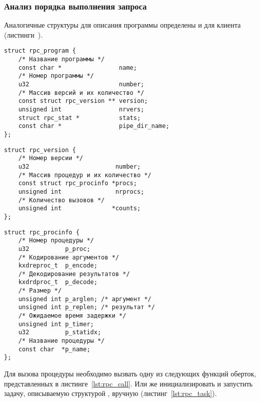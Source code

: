 \subsubsection{Анализ порядка выполнения запроса}

Аналогичные структуры для описания программы определены и для клиента
(листинги~).

\clearpage

\begin{lstlisting}[caption={Структура программы}, label={lst:struct_rpc_program}]
struct rpc_program {
    /* Название программы */
    const char *                name;
    /* Номер программы */
    u32                         number;
    /* Массив версий и их количество */
    const struct rpc_version ** version;
    unsigned int                nrvers;
    struct rpc_stat *           stats;
    const char *                pipe_dir_name;
};
\end{lstlisting}

\begin{lstlisting}[caption={Структура версии}, label={lst:struct_rpc_version}]
struct rpc_version {
    /* Номер версии */
    u32                        number;
    /* Массив процедур и их количество */
    const struct rpc_procinfo *procs;
    unsigned int               nrprocs;
    /* Количество вызовов */
    unsigned int              *counts;
};
\end{lstlisting}

\begin{lstlisting}[caption={Структура процедуры}, label={lst:struct_rpc_procedure}]
struct rpc_procinfo {
    /* Номер процедуры */
    u32          p_proc;
    /* Кодирование аргументов */
    kxdreproc_t  p_encode;
    /* Декодирование результатов */
    kxdrdproc_t  p_decode;
    /* Размер */
    unsigned int p_arglen; /* аргумент */
    unsigned int p_replen; /* результат */
    /* Ожидаемое время задержки */
    unsigned int p_timer;
    u32          p_statidx;
    /* Название процедуры */
    const char  *p_name;
};
\end{lstlisting}

Для вызова процедуры необходимо вызвать одну из следующих функций оберток,
представленных в листинге~\ref{lst:rpc_call}. Или же инициализировать и
запустить задачу, описываемую структурой , вручную
(листинг~\ref{lst:rpc_task}).


